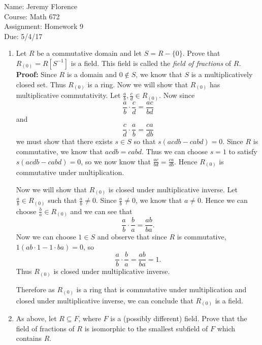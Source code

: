 \documentclass{article}
\newcommand\Proof{%
	\textbf{Proof:} %
}
\begin{document}
Name: Jeremy Florence\\
Course: Math 672\\
Assignment: Homework 9\\
Due: 5/4/17\\

\begin{enumerate}
\item Let $R$ be a commutative domain and let $S=R-\{0\}.$ Prove that $R_{(0)}=R[S^{-1}]$ is a field. This field is called the \emph{field of fractions} of $R$.\\

\Proof Since $R$ is a domain and $0 \not \in S$, we know that $S$ is a multiplicatively closed set. Thus $R_{(0)}$ is a ring. Now we will show that $R_{(0)}$ has multiplicative commutativity. Let $\frac{a}{b},\frac{c}{d} \in R_{(0)}$. Now since $$\frac{a}{b} \cdot \frac{c}{d}=\frac{ac}{bd}$$ and $$\frac{c}{d} \cdot \frac{a}{b}=\frac{ca}{db}$$ we must show that there exists $s \in S$ so that $s(acdb-cabd)=0$. Since $R$ is commutative, we know that $acdb=cabd$. Thus we can choose $s=1$ to satisfy $s(acdb-cabd)=0$, so we now know that $\frac{ac}{bd}=\frac{ca}{db}$. Hence $R_{(0)}$ is commutative under multiplication.

Now we will show that $R_{(0)}$ is closed under multiplicative inverse. Let $\frac{a}{b} \in R_{(0)}$ such that $\frac{a}{b} \neq 0$. Since $\frac{a}{b} \neq 0$, we know that $a \neq 0$. Hence we can choose $\frac{b}{a} \in R_{(0)}$ and we can see that $$\frac{a}{b} \cdot \frac{b}{a}=\frac{ab}{ba}.$$ Now we can choose $1 \in S$ and observe that since $R$ is commutative, $1(ab \cdot 1 - 1 \cdot ba)=0$, so $$\frac{a}{b} \cdot \frac{b}{a}=\frac{ab}{ba}=1.$$ Thus $R_{(0)}$ is closed under multiplicative inverse.

Therefore as $R_{(0)}$ is a ring that is commutative under multiplication and closed under multiplicative inverse, we can conclude that $R_{(0)}$ is a field.

\item As above, let $R \subseteq F$, where $F$ is a (possibly different) field. Prove that the field of fractions of $R$ is isomorphic to the smallest subfield of $F$ which contains $R$.\\


\end{enumerate}
\end{document}
